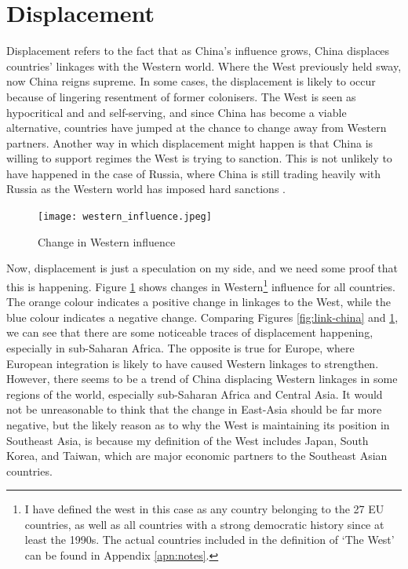 \section{Displacement}
Displacement refers to the fact that as China's influence grows, China displaces countries' linkages with the Western world. Where the West previously held sway, now China reigns supreme. In some cases, the displacement is likely to occur because of lingering resentment of former colonisers. The West is seen as hypocritical and and self-serving, and since China has become a viable alternative, countries have jumped at the chance to change away from Western partners. Another way in which displacement might happen is that China is willing to support regimes the West is trying to sanction. This is not unlikely to have happened in the case of Russia, where China is still trading heavily with Russia as the Western world has imposed hard sanctions \citep{beijing_newsroom_china-russia_2025}.

\begin{figure}[hbt!]
\centering
\texttt{[image: western\_influence.jpeg]}
\caption{Change in Western influence}
\label{fig:west}
\end{figure}

Now, displacement is just a speculation on my side, and we need some proof that this is happening. Figure \ref{fig:west} shows changes in Western\footnote{I have defined the west in this case as any country belonging to the 27 EU countries, as well as all countries with a strong democratic history since at least the 1990s. The actual countries included in the definition of `The West' can be found in Appendix \ref{apn:notes}.} influence for all countries. The orange colour indicates a positive change in linkages to the West, while the blue colour indicates a negative change. Comparing Figures \ref{fig:link-china} and \ref{fig:west}, we can see that there are some noticeable traces of displacement happening, especially in sub-Saharan Africa. The opposite is true for Europe, where European integration is likely to have caused Western linkages to strengthen. However, there seems to be a trend of China displacing Western linkages in some regions of the world, especially sub-Saharan Africa and Central Asia. It would not be unreasonable to think that the change in East-Asia should be far more negative, but the likely reason as to why the West is maintaining its position in Southeast Asia, is because my definition of the West includes Japan, South Korea, and Taiwan, which are major economic partners to the Southeast Asian countries. 

